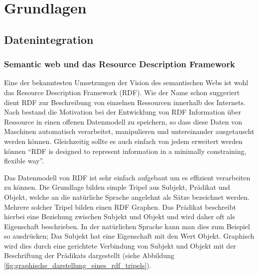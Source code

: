 

\chapter{Grundlagen} %
\label{cha:grundlagen}

\section{Datenintegration} %
\label{sec:datenintegration}



\subsection{Semantic web und das Resource Description Framework} %
\label{sub:semantic_web_und_das_resource_description_framework}




Eine der bekanntesten Umsetzungen der Vision des  semantischen Webs ist wohl das Resource Description Framework (RDF). Wie der Name schon suggeriert dient RDF zur Beschreibung von einzelnen Ressourcen innerhalb des Internets. Nach \cite{Klyne2004,Manola2004} bestand die Motivation bei der Entwicklung von RDF Information über Ressource in einen offenen Datenmodell zu speichern, so dass diese Daten von Maschinen automatisch verarbeitet, manipulieren und untereinander ausgetauscht werden können. Gleichzeitig sollte es auch einfach von jedem erweitert werden können \enquote{RDF is designed to represent information in a minimally constraining, flexible way}\cite{Klyne2004}.

\medskip

Das Datenmodell von RDF ist sehr einfach aufgebaut um es effizient verarbeiten zu können. Die Grundlage bilden simple Tripel aus Subjekt, Prädikat und Objekt, welche an die natürliche Sprache angelehnt als Sätze\cite{Heinzen} bezeichnet werden. Mehrere solcher Tripel bilden einen RDF Graphen. Das Prädikat beschreibt hierbei eine Beziehung zwischen Subjekt und Objekt und wird daher oft als Eigenschaft beschrieben. In der natürlichen Sprache kann man dies zum Beispiel so ausdrücken; Das Subjekt hat eine Eigenschaft mit den Wert Objekt. Graphisch wird dies durch eine gerichtete Verbindung von Subjekt und Objekt mit der Beschriftung der Prädikats dargestellt (siehe Abbildung \ref{fig:graphische_darstellung_eines_rdf_tripels}).

